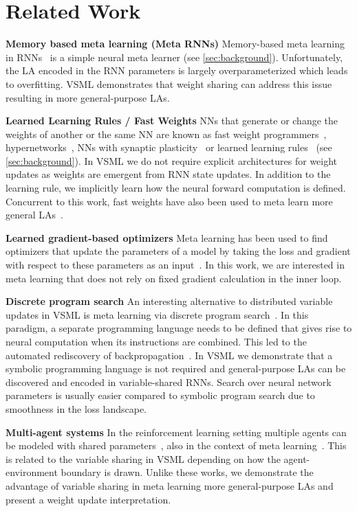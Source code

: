 \documentclass{article}
\newcommand{\principle}{VSML}
\begin{document}
\section{Related Work}

\textbf{Memory based meta learning (Meta RNNs)}
Memory-based meta learning in RNNs~\citep{Hochreiter2001,Duan2016,Wang2016} is a simple neural meta learner (see \autoref{sec:background}).
Unfortunately, the LA encoded in the RNN parameters is largely overparameterized which leads to overfitting.
{\principle} demonstrates that weight sharing can address this issue resulting in more general-purpose LAs.

\textbf{Learned Learning Rules / Fast Weights}
NNs that generate or change the weights of another or the same NN are known as fast weight programmers~\citep{Schmidhuber:91fastweights}, hypernetworks~\citep{Ha2016}, NNs with synaptic plasticity~\citep{Miconi2018DifferentiableBackpropagation} or learned learning rules~\citep{Bengio1992OnRule} (see \autoref{sec:background}).
In {\principle} we do not require explicit architectures for weight updates as weights are emergent from RNN state updates.
In addition to the learning rule, we implicitly learn how the neural forward computation is defined.
Concurrent to this work, fast weights have also been used to meta learn more general LAs~\citep{sandler2021meta}.

\textbf{Learned gradient-based optimizers}
Meta learning has been used to find optimizers that update the parameters of a model by taking the loss and gradient with respect to these parameters as an input~\citep{Ravia,Andrychowicz2016,Li2016b,Metz2020}.
In this work, we are interested in meta learning that does not rely on fixed gradient calculation in the inner loop.

\textbf{Discrete program search}
An interesting alternative to distributed variable updates in {\principle} is meta learning via discrete program search~\citep{Schmidhuber:94kol,Real2020}.
In this paradigm, a separate programming language needs to be defined that gives rise to neural computation when its instructions are combined.
This led to the automated rediscovery of backpropagation~\citep{Real2020}.
In VSML we demonstrate that a symbolic programming language is not required and general-purpose LAs can be discovered and encoded in variable-shared RNNs.
Search over neural network parameters is usually easier compared to symbolic program search due to smoothness in the loss landscape.

\textbf{Multi-agent systems}
In the reinforcement learning setting multiple agents can be modeled with shared parameters~\citep{SimsKarl1994,Pathak2019,huang2020smp}, also in the context of meta learning~\citep{Rosa2019}.
This is related to the variable sharing in {\principle} depending on how the agent-environment boundary is drawn.
Unlike these works, we demonstrate the advantage of variable sharing in meta learning more general-purpose LAs and present a weight update interpretation.
\end{document}
